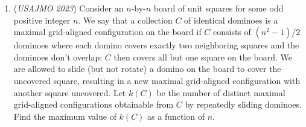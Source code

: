 \begin{enumerate}
 The imaginary part of $Q=0$, so $2ki=\frac{(a-\frac{1}{a}+-c+\frac{1}{c})}{2}$
$Q = \frac{-a-\frac{1}{a}-c-\frac{1}{c}}{2}$

 


 
Now all we need to do is to check that $A,B,P,Q$ are conc-cyclic.

 $\frac{(A-P)(B-Q)}{(A-Q)(B-P)} \in R$

 Throwing out the half and some negative terms for simplicity.

 $\frac{(a+\frac{1}{c}-c-\frac{a}{c^2})({a+\frac{1}{a}-c-\frac{1}{c}})}{(3a+\frac{3}{c}+\frac{1}{a} + c)(\frac{3}{c}+3c+a+\frac{a}{c^2})} \in R$

 
So we need to prove that:

 $\frac{(a+\frac{1}{c}-c-\frac{a}{c^2})({a+\frac{1}{a}-c-\frac{1}{c}})}{(3a+\frac{3}{c}+\frac{1}{a} + c)(\frac{3}{c}+3c+a+\frac{a}{c^2})} =\frac{(\frac{1}{a}+c-\frac{1}{c}-\frac{c^2}{a})({a+\frac{1}{a}-c-\frac{1}{c}})}{(\frac{3}{a}+3c+a + \frac{1}{c})(3c+\frac{3}{c}+\frac{1}{a}+\frac{c^2}{a})}$

 
On the RHS, we can multiply the numerator and denominator by $\frac{a}{c}$ to get:

 $(3a+\frac{3}{c}+\frac{1}{a} + c)(\frac{3}{c}+3c+a+\frac{a}{c^2})=(\frac{3}{a}+3c+a + \frac{1}{c})(3a+\frac{3a}{c^2}+\frac{1}{c}+c)$
$(3+\frac{c}{a})(a+\frac{1}{c})(3+\frac{a}{c})(c+\frac{1}{c})=(a+\frac{1}{c})(1+\frac{3c}{a})(c+\frac{1}{c})(\frac{3a}{c}+1)$
$(3+\frac{c}{a})(3+\frac{a}{c})=(1+\frac{3c}{a})(\frac{3a}{c}+1)$

 Which is true if you multiply $ac$ on both sides. Thus, we are done (note we could have factored earlier which would have saved tremendous time).

 


	\item (\textit{USAJMO 2023}) Consider an $n$-by-$n$ board of unit squares for some odd positive integer $n$. We say that a collection $C$ of identical dominoes is a maximal grid-aligned configuration on the board if $C$ consists of $(n^2-1)/2$ dominoes where each domino covers exactly two neighboring squares and the dominoes don't overlap: $C$ then covers all but one square on the board. We are allowed to slide (but not rotate) a domino on the board to cover the uncovered square, resulting in a new maximal grid-aligned configuration with another square uncovered. Let $k(C)$ be the number of distinct maximal grid-aligned configurations obtainable from $C$ by repeatedly sliding dominoes. Find the maximum value of $k(C)$ as a function of $n$.



\end{enumerate}
